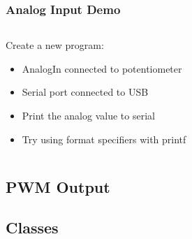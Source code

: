 \begin{frame}[fragile]
	\frametitle{Analog Input Demo}
	\begin{columns}[T]
		\begin{column}{0.5\textwidth}
			Create a new program:
			\begin{itemize}
				\item AnalogIn connected to potentiometer
				\item Serial port connected to USB
				\item Print the analog value to serial
				\item Try using format specifiers with printf
			\end{itemize}
		\end{column}
		\pause
		\begin{column}{0.5\textwidth}
			
		\end{column}
	\end{columns}
\end{frame}

\subsection{PWM Output}
\label{sub:pwm_output}


\subsection{Classes}
\label{sub:classes}

